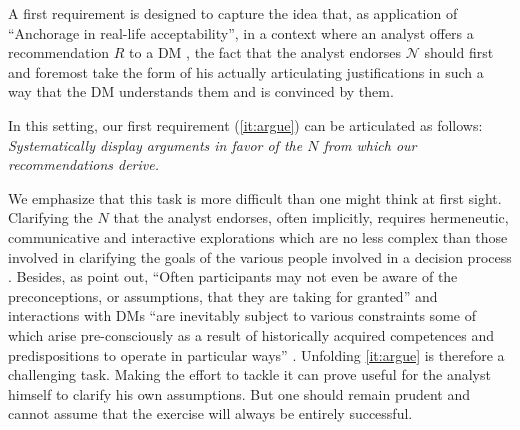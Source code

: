 \documentclass[preprint, french, english, 11pt, authoryear]{elsarticle}%
\newcommand{\adv}{\mathscr{N}}
\begin{document}
A first requirement is designed to capture the idea that, as application of “Anchorage in real-life acceptability”, in a context where an analyst offers a recommendation $R$ to a \ac{DM}
, 
the fact that the analyst endorses $\adv$ should first and foremost take the form of his actually articulating justifications in such a way that the \ac{DM}
 understands them and is convinced by them.


In this setting, our first requirement (\cref{it:argue}) can be articulated as follows: \emph{Systematically display arguments in favor of the $N$ from which our recommendations derive.}

We emphasize that this task is more difficult than one might think at first sight.
Clarifying the $N$ that the analyst endorses, often implicitly, requires hermeneutic, communicative and interactive explorations which are no less complex than those involved in clarifying the goals of the various people involved in a decision process \citep{reisach_creation_2016}.
Besides, as \citet{cronin_issues_2014} point out, ``Often participants may not even be aware of the preconceptions, or assumptions, that they are taking for granted'' and interactions with \acp{DM} 
``are inevitably subject to various constraints some of which arise pre-consciously as a result of historically acquired competences and predispositions to operate in particular ways'' \citep{brocklesby_ethics_2009}.
Unfolding \cref{it:argue} is therefore a challenging task. Making the effort to tackle it can prove useful for the analyst himself to clarify his own assumptions. But one should remain prudent and cannot assume that the exercise will always be entirely successful.
\end{document}
